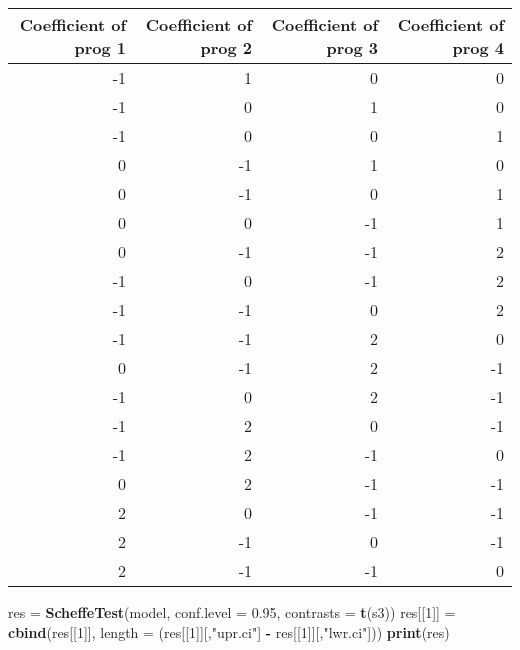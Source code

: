 \documentclass[]{article}
\newenvironment{Shaded}{\begin{snugshade}}{\end{snugshade}}
\newcommand{\KeywordTok}[1]{\textcolor[rgb]{0.13,0.29,0.53}{\textbf{#1}}}
\newcommand{\DataTypeTok}[1]{\textcolor[rgb]{0.13,0.29,0.53}{#1}}
\newcommand{\DecValTok}[1]{\textcolor[rgb]{0.00,0.00,0.81}{#1}}
\newcommand{\FloatTok}[1]{\textcolor[rgb]{0.00,0.00,0.81}{#1}}
\newcommand{\StringTok}[1]{\textcolor[rgb]{0.31,0.60,0.02}{#1}}
\newcommand{\OperatorTok}[1]{\textcolor[rgb]{0.81,0.36,0.00}{\textbf{#1}}}
\newcommand{\NormalTok}[1]{#1}
\begin{document}
\begin{table}[H]
\centering
\begin{tabular}{r|r|r|r}
\hline
Coefficient of prog 1 & Coefficient of prog 2 & Coefficient of prog 3 & Coefficient of prog 4\\
\hline
-1 & 1 & 0 & 0\\
\hline
-1 & 0 & 1 & 0\\
\hline
-1 & 0 & 0 & 1\\
\hline
0 & -1 & 1 & 0\\
\hline
0 & -1 & 0 & 1\\
\hline
0 & 0 & -1 & 1\\
\hline
0 & -1 & -1 & 2\\
\hline
-1 & 0 & -1 & 2\\
\hline
-1 & -1 & 0 & 2\\
\hline
-1 & -1 & 2 & 0\\
\hline
0 & -1 & 2 & -1\\
\hline
-1 & 0 & 2 & -1\\
\hline
-1 & 2 & 0 & -1\\
\hline
-1 & 2 & -1 & 0\\
\hline
0 & 2 & -1 & -1\\
\hline
2 & 0 & -1 & -1\\
\hline
2 & -1 & 0 & -1\\
\hline
2 & -1 & -1 & 0\\
\hline
\end{tabular}
\end{table}

\begin{Shaded}
\begin{Highlighting}[]
\NormalTok{res =}\StringTok{ }\KeywordTok{ScheffeTest}\NormalTok{(model, }\DataTypeTok{conf.level =} \FloatTok{0.95}\NormalTok{, }\DataTypeTok{contrasts =} \KeywordTok{t}\NormalTok{(s3))}
\NormalTok{res[[}\DecValTok{1}\NormalTok{]] =}\StringTok{ }\KeywordTok{cbind}\NormalTok{(res[[}\DecValTok{1}\NormalTok{]], }\DataTypeTok{length =}\NormalTok{ (res[[}\DecValTok{1}\NormalTok{]][,}\StringTok{"upr.ci"}\NormalTok{] }\OperatorTok{-}\StringTok{ }\NormalTok{res[[}\DecValTok{1}\NormalTok{]][,}\StringTok{"lwr.ci"}\NormalTok{]))}
\KeywordTok{print}\NormalTok{(res)}
\end{Highlighting}
\end{Shaded}
\end{document}
